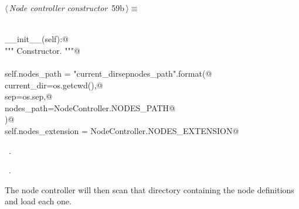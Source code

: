 \documentclass[
    a4paper,      %
    10pt,         %
    openright,    %
    notitlepage,  %
    parskip=half, %
]{scrreprt}       %
\theoremstyle{definition}                    %
\begin{document}
\begin{flushleft} \small
\begin{minipage}{\linewidth}\label{scrap98}\raggedright\small
{} $\langle\,${\itshape Node controller constructor}\nobreak\ {\footnotesize {59b}}$\,\rangle\equiv$
\vspace{-1ex}
\begin{list}{}{} \item
\mbox{}\lstinline@@\\
\mbox{}\lstinline@def __init__(self):@\\
\mbox{}\lstinline@    """ Constructor. """@\\
\mbox{}\lstinline@@\\
\mbox{}\lstinline@    self.nodes_path = "{current_dir}{sep}{nodes_path}".format(@\\
\mbox{}\lstinline@        current_dir=os.getcwd(),@\\
\mbox{}\lstinline@        sep=os.sep,@\\
\mbox{}\lstinline@        nodes_path=NodeController.NODES_PATH@\\
\mbox{}\lstinline@    )@\\
\mbox{}\lstinline@    self.nodes_extension = NodeController.NODES_EXTENSION@{\NWsep}
\end{list}
\vspace{-1.5ex}
\footnotesize
\begin{list}{}{\setlength{\itemsep}{-\parsep}\setlength{\itemindent}{-\leftmargin}}
\item \NWtxtMacroDefBy\ .
\item \NWtxtMacroRefIn\ .

\item{}
\end{list}
\end{minipage}\vspace{4ex}
\end{flushleft}
The node controller will then scan that directory containing the node
definitions and load each one.
\end{document}
